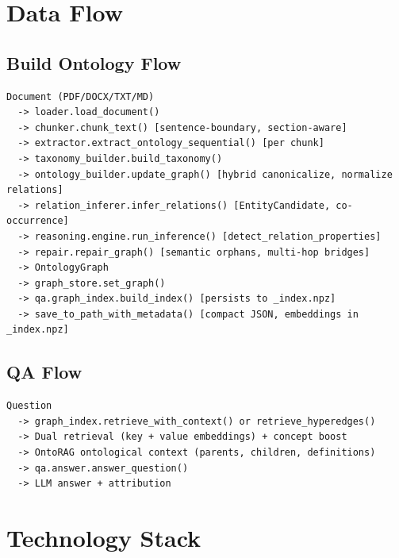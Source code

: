 \documentclass[11pt,a4paper]{article}
\begin{document}
\section{Data Flow}

\subsection{Build Ontology Flow}

\begin{verbatim}
Document (PDF/DOCX/TXT/MD)
  -> loader.load_document()
  -> chunker.chunk_text() [sentence-boundary, section-aware]
  -> extractor.extract_ontology_sequential() [per chunk]
  -> taxonomy_builder.build_taxonomy()
  -> ontology_builder.update_graph() [hybrid canonicalize, normalize relations]
  -> relation_inferer.infer_relations() [EntityCandidate, co-occurrence]
  -> reasoning.engine.run_inference() [detect_relation_properties]
  -> repair.repair_graph() [semantic orphans, multi-hop bridges]
  -> OntologyGraph
  -> graph_store.set_graph()
  -> qa.graph_index.build_index() [persists to _index.npz]
  -> save_to_path_with_metadata() [compact JSON, embeddings in _index.npz]
\end{verbatim}

\subsection{QA Flow}

\begin{verbatim}
Question
  -> graph_index.retrieve_with_context() or retrieve_hyperedges()
  -> Dual retrieval (key + value embeddings) + concept boost
  -> OntoRAG ontological context (parents, children, definitions)
  -> qa.answer.answer_question()
  -> LLM answer + attribution
\end{verbatim}

\section{Technology Stack}
\end{document}
